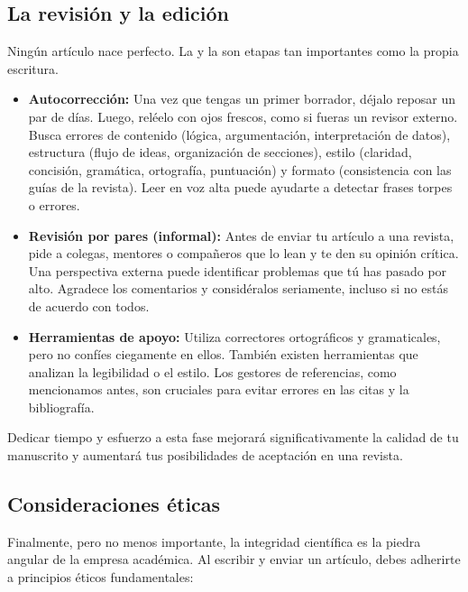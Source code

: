 \subsection*{La revisión y la edición}
\label{sub:revisionyedicions}

Ningún artículo nace perfecto. La  y la
 son etapas tan importantes como la propia escritura.

\begin{itemize}
  \item \textbf{Autocorrección:} Una vez que tengas un primer borrador, déjalo
        reposar un par de días.
        Luego, reléelo con ojos frescos, como si fueras un revisor externo.
        Busca errores de contenido (lógica, argumentación, interpretación de
        datos), estructura (flujo de ideas, organización de secciones), estilo
        (claridad, concisión, gramática, ortografía, puntuación) y formato
        (consistencia con las guías de la revista).
        Leer en voz alta puede ayudarte a detectar frases torpes o errores.
  \item \textbf{Revisión por pares (informal):} Antes de enviar tu artículo a
        una revista, pide a colegas, mentores o compañeros que lo lean y te den
        su opinión crítica.
        Una perspectiva externa puede identificar problemas que tú has pasado por
        alto.
        Agradece los comentarios y considéralos seriamente, incluso si no estás
        de acuerdo con todos.
  \item \textbf{Herramientas de apoyo:} Utiliza correctores ortográficos y
        gramaticales, pero no confíes ciegamente en ellos.
        También existen herramientas que analizan la legibilidad o el estilo.
        Los gestores de referencias, como mencionamos antes, son cruciales para
        evitar errores en las citas y la bibliografía.
\end{itemize}
Dedicar tiempo y esfuerzo a esta fase mejorará significativamente la calidad de
tu manuscrito y aumentará tus posibilidades de aceptación en una revista.

\subsection*{Consideraciones éticas}
\label{sub:eticapublicacion}

Finalmente, pero no menos importante, la integridad científica es la piedra
angular de la empresa académica.
Al escribir y enviar un artículo, debes adherirte a principios éticos
fundamentales:

